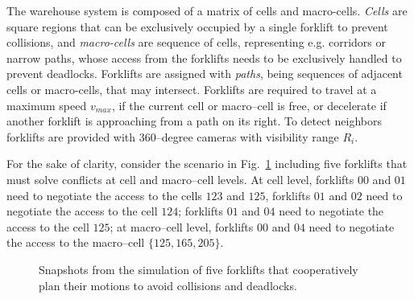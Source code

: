 \documentclass[journal, onecolumn, 12pt]{styles/IEEEtran}
\begin{document}
The warehouse system is composed of a matrix of cells and macro-cells. {\em Cells} are square regions that can be exclusively occupied by a single forklift to prevent collisions, and {\em macro-cells} are sequence of cells, representing e.g. corridors or narrow paths, whose access from the forklifts needs to be exclusively handled to prevent deadlocks. Forklifts are assigned with {\em paths}, being sequences of adjacent cells or macro-cells, that may intersect. Forklifts are required to travel at a maximum speed $v_{max}$, if the current cell or macro--cell is free, or decelerate if another forklift is approaching  from a path on its right. To detect neighbors forklifts are provided with $360$--degree cameras with visibility range $R_i$. 

For the sake of clarity, consider the scenario in Fig.~\ref{fig:sofidel-example} including five forklifts that must solve conflicts at cell and macro--cell levels. At cell level, forklifts $00$ and $01$ need to  negotiate the access to the cells $123$ and $125$, forklifts $01$ and $02$ need to negotiate the access to the cell $124$; forklifts $01$ and $04$ need to negotiate the access to the cell $125$; at macro--cell level, forklifts $00$ and $04$ need to negotiate the access to the macro--cell $\{125, 165, 205\}$.
%
\begin{figure}[!]
\centering
{}
\caption{Snapshots from the simulation of five forklifts that cooperatively plan their motions to avoid collisions and deadlocks.}
\label{fig:sofidel-example}
\end{figure}
\end{document}
